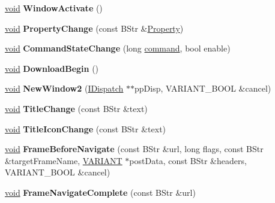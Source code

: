 \begin{DoxyCompactItemize}
\hyperlink{interfacevoid}{void} {\bfseries Window\+Activate} ()
\item 
\mbox{\label{struct_web_child_window_a7c8109cd952bd9ada7f45f7057b0ce05}} 
\hyperlink{interfacevoid}{void} {\bfseries Property\+Change} (const B\+Str \&\hyperlink{struct_property}{Property})
\item 
\mbox{\label{struct_web_child_window_a038afed7a3ca4ff020154ab18021d345}} 
\hyperlink{interfacevoid}{void} {\bfseries Command\+State\+Change} (long \hyperlink{structcommand}{command}, bool enable)
\item 
\mbox{\label{struct_web_child_window_abc4c1261806ae584e0d8f4050af68742}} 
\hyperlink{interfacevoid}{void} {\bfseries Download\+Begin} ()
\item 
\mbox{\label{struct_web_child_window_ac2170ad704b534d5246280274d879a51}} 
\hyperlink{interfacevoid}{void} {\bfseries New\+Window2} (\hyperlink{interface_i_dispatch}{I\+Dispatch} $\ast$$\ast$pp\+Disp, V\+A\+R\+I\+A\+N\+T\+\_\+\+B\+O\+OL \&cancel)
\item 
\mbox{\label{struct_web_child_window_a932b173db14c967882fa17c16aada8db}} 
\hyperlink{interfacevoid}{void} {\bfseries Title\+Change} (const B\+Str \&text)
\item 
\mbox{\label{struct_web_child_window_a83487287135f62eb601a0c13fb99d3f8}} 
\hyperlink{interfacevoid}{void} {\bfseries Title\+Icon\+Change} (const B\+Str \&text)
\item 
\mbox{\label{struct_web_child_window_a8b51ac8bd35859e4bd4141d35f0d95b9}} 
\hyperlink{interfacevoid}{void} {\bfseries Frame\+Before\+Navigate} (const B\+Str \&url, long flags, const B\+Str \&target\+Frame\+Name, \hyperlink{structtag_v_a_r_i_a_n_t}{V\+A\+R\+I\+A\+NT} $\ast$post\+Data, const B\+Str \&headers, V\+A\+R\+I\+A\+N\+T\+\_\+\+B\+O\+OL \&cancel)
\item 
\mbox{\label{struct_web_child_window_a8913c4a743887e0980f9408b08b83936}} 
\hyperlink{interfacevoid}{void} {\bfseries Frame\+Navigate\+Complete} (const B\+Str \&url)
$$
\end{DoxyCompactItemize}
